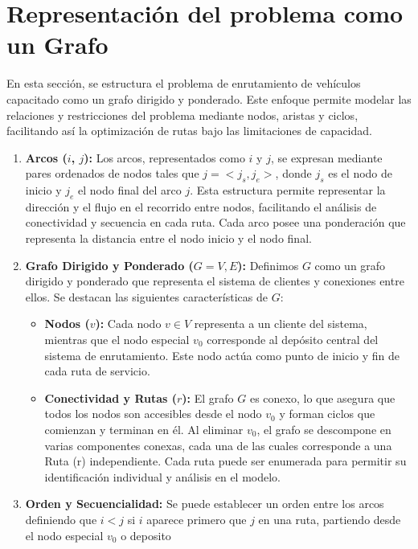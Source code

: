 \documentclass{article}
\begin{document}
\section {Representación del problema como un Grafo}

En esta sección, se estructura el problema de enrutamiento de vehículos capacitado como un grafo dirigido y ponderado. Este enfoque permite modelar las relaciones y restricciones del problema mediante nodos, aristas y ciclos, facilitando así la optimización de rutas bajo las limitaciones de capacidad.\cite{ref1}

\begin{enumerate}

\item \textbf{Arcos ($i$, $j$):} Los arcos, representados como $i$ y $j$, se expresan mediante pares ordenados de nodos tales que $j = <j_s, j_e>$, donde $j_s$ es el nodo de inicio y $j_e$ el nodo final del arco $j$. Esta estructura permite representar la dirección y el flujo en el recorrido entre nodos, facilitando el análisis de conectividad y secuencia en cada ruta. Cada arco posee una ponderación que representa la distancia entre el nodo inicio y el  nodo final.

\item \textbf{Grafo Dirigido y Ponderado ($G={V,E}$):} Definimos $G$ como un grafo dirigido y ponderado que representa el sistema de clientes y conexiones entre ellos. Se destacan las siguientes características de $G$: 

\begin{itemize}

 \item \textbf{Nodos ($v$):} Cada nodo $v \in V$ representa a un cliente del sistema, mientras que el nodo especial $v_0$ corresponde al depósito central del sistema de enrutamiento. Este nodo actúa como punto de inicio y fin de cada ruta de servicio. 

\item \textbf{Conectividad y Rutas ($r$):} El grafo $G$ es conexo, lo que asegura que todos los nodos son accesibles desde el nodo $v_0$ y forman ciclos que comienzan y terminan en él. Al eliminar $v_0$, el grafo se descompone en varias componentes conexas, cada una de las cuales corresponde a una Ruta (r) independiente. Cada ruta puede ser enumerada para permitir su identificación individual y análisis en el modelo. 
\end{itemize}

\item \textbf{Orden y Secuencialidad:} Se puede establecer un orden entre los arcos definiendo que $i<j$ si $i$ aparece primero que $j$ en una ruta, partiendo desde el nodo especial $v_0$ o deposito

\end{enumerate}
\end{document}
